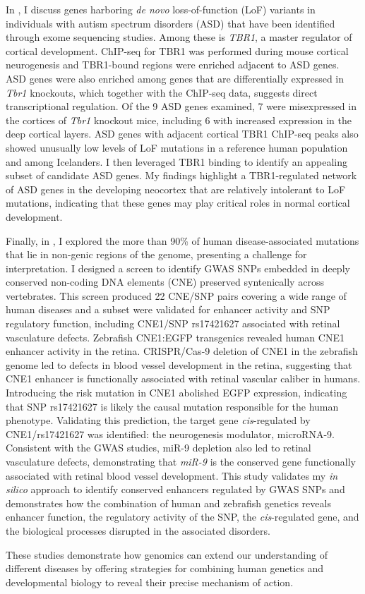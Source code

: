 In , I discuss genes harboring \emph{de novo} loss-of-function (LoF) variants in individuals with autism spectrum disorders (ASD) that have been identified through exome sequencing studies. Among these is \emph{TBR1}, a master regulator of cortical development. ChIP-seq for TBR1 was performed during mouse cortical neurogenesis and TBR1-bound regions were enriched adjacent to ASD genes. ASD genes were also enriched among genes that are differentially expressed in \emph{Tbr1} knockouts, which together with the ChIP-seq data, suggests direct transcriptional regulation. Of the 9 ASD genes examined, 7 were misexpressed in the cortices of \emph{Tbr1} knockout mice, including 6 with increased expression in the deep cortical layers. ASD genes with adjacent cortical TBR1 ChIP-seq peaks also showed unusually low levels of LoF mutations in a reference human population and among Icelanders. I then leveraged TBR1 binding to identify an appealing subset of candidate ASD genes. My findings highlight a TBR1-regulated network of ASD genes in the developing neocortex that are relatively intolerant to LoF mutations, indicating that these genes may play critical roles in normal cortical development.

Finally, in , I explored the more than 90\% of human disease-associated mutations that lie in non-genic regions of the genome, presenting a challenge for interpretation. I designed a screen to identify GWAS SNPs embedded in deeply conserved non-coding DNA elements (CNE) preserved syntenically across vertebrates. This screen produced 22 CNE/SNP pairs covering a wide range of human diseases and a subset  were validated for enhancer activity and SNP regulatory function, including CNE1/SNP rs17421627 associated with retinal vasculature defects. Zebrafish CNE1:EGFP transgenics revealed human CNE1 enhancer activity in the retina. CRISPR/Cas-9 deletion of CNE1 in the zebrafish genome led to defects in blood vessel development in the retina, suggesting that CNE1 enhancer is functionally associated with retinal vascular caliber in humans. Introducing the risk mutation in CNE1 abolished EGFP expression, indicating that SNP rs17421627 is likely the causal mutation responsible for the human phenotype. Validating this prediction, the target gene \emph{cis}-regulated by CNE1/rs17421627 was identified: the neurogenesis modulator, microRNA-9. Consistent with the GWAS studies, miR-9 depletion also led to retinal vasculature defects, demonstrating that \emph{miR-9} is the conserved gene functionally associated with retinal blood vessel development. This study validates my \emph{in silico} approach to identify conserved enhancers regulated by GWAS SNPs and demonstrates how the combination of human and zebrafish genetics reveals enhancer function, the regulatory activity of the SNP, the \emph{cis}-regulated gene, and the biological processes disrupted in the associated disorders.

These studies demonstrate how genomics can extend our understanding of different diseases by offering strategies for combining human genetics and developmental biology to reveal their precise mechanism of action.
